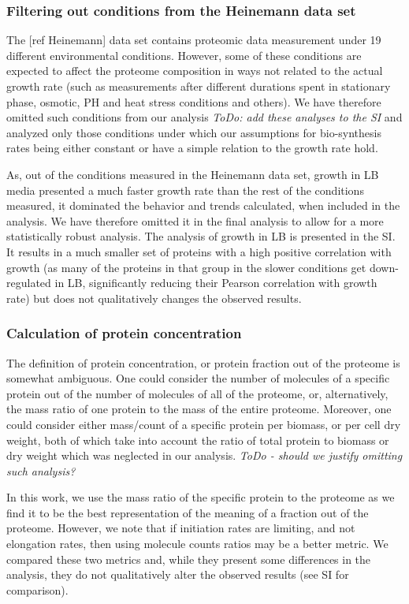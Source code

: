 \documentclass[notitlepage]{article}
\begin{document}
\subsubsection{Filtering out conditions from the Heinemann data set}
\label{heinemanncond}
The [ref Heinemann] data set contains proteomic data measurement under 19 different environmental conditions.
However, some of these conditions are expected to affect the proteome composition in ways not related to the actual growth rate (such as measurements after different durations spent in stationary phase, osmotic, PH and heat stress conditions and others).
We have therefore omitted such conditions from our analysis \emph{ToDo: add these analyses to the SI} and analyzed only those conditions under which our assumptions for bio-synthesis rates being either constant or have a simple relation to the growth rate hold.

As, out of the conditions measured in the Heinemann data set, growth in LB media presented a much faster growth rate than the rest of the conditions measured, it dominated the behavior and trends calculated, when included in the analysis.
We have therefore omitted it in the final analysis to allow for a more statistically robust analysis.
The analysis of growth in LB is presented in the SI.
It results in a much smaller set of proteins with a high positive correlation with growth (as many of the proteins in that group in the slower conditions get down-regulated in LB, significantly reducing their Pearson correlation with growth rate) but does not qualitatively changes the observed results.

\subsubsection{Calculation of protein concentration}
\label{protconc}
The definition of protein concentration, or protein fraction out of the proteome is somewhat ambiguous.
One could consider the number of molecules of a specific protein out of the number of molecules of all of the proteome, or, alternatively, the mass ratio of one protein to the mass of the entire proteome.
Moreover, one could consider either mass/count of a specific protein per biomass, or per cell dry weight, both of which take into account the ratio of total protein to biomass or dry weight which was neglected in our analysis.
\emph{ToDo - should we justify omitting such analysis?}

In this work, we use the mass ratio of the specific protein to the proteome as we find it to be the best representation of the meaning of a fraction out of the proteome.
However, we note that if initiation rates are limiting, and not elongation rates, then using molecule counts ratios may be a better metric.
We compared these two metrics and, while they present some differences in the analysis, they do not qualitatively alter the observed results (see SI for comparison).
\end{document}
